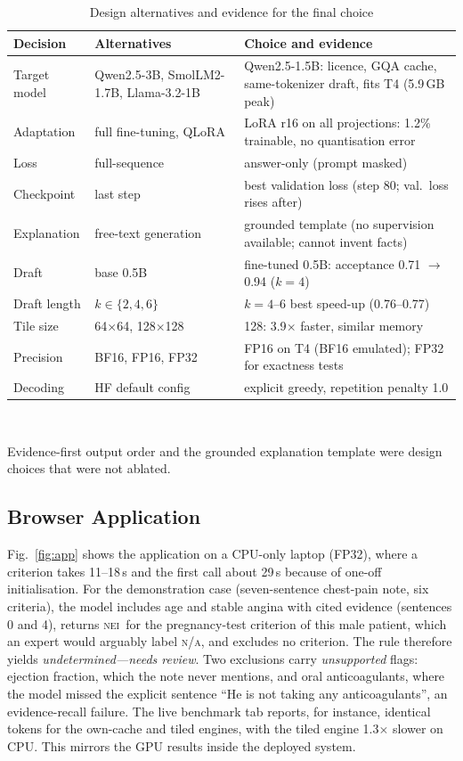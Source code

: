 \documentclass[conference]{IEEEtran}
\newcommand{\NEI}{\textsc{nei}}
\newcommand{\NA}{\textsc{n/a}}
\begin{document}
\begin{table}[t]
\caption{Design alternatives and evidence for the final choice}
\label{tab:design}
\centering
\scriptsize
\setlength{\tabcolsep}{2.5pt}
\begin{tabular}{p{1.35cm}p{2.85cm}p{3.75cm}}
\toprule
Decision & Alternatives & Choice and evidence\\
\midrule
Target model & Qwen2.5-3B, SmolLM2-1.7B, Llama-3.2-1B & Qwen2.5-1.5B: licence, GQA cache, same-tokenizer draft, fits T4 (5.9\,GB peak)\\
Adaptation & full fine-tuning, QLoRA & LoRA r16 on all projections: 1.2\% trainable, no quantisation error\\
Loss & full-sequence & answer-only (prompt masked)\\
Checkpoint & last step & best validation loss (step 80; val.\ loss rises after)\\
Explanation & free-text generation & grounded template (no supervision available; cannot invent facts)\\
Draft & base 0.5B & fine-tuned 0.5B: acceptance 0.71 $\rightarrow$ 0.94 ($k{=}4$)\\
Draft length & $k\in\{2,4,6\}$ & $k{=}4$--6 best speed-up (0.76--0.77)\\
Tile size & 64$\times$64, 128$\times$128 & 128: 3.9$\times$ faster, similar memory\\
Precision & BF16, FP16, FP32 & FP16 on T4 (BF16 emulated); FP32 for exactness tests\\
Decoding & HF default config & explicit greedy, repetition penalty 1.0\\
\bottomrule
\end{tabular}
\\[2pt]
\parbox{\columnwidth}{\scriptsize Evidence-first output order and the grounded explanation template were design choices that were not ablated.}
\end{table}

\subsection{Browser Application}
Fig.~\ref{fig:app} shows the application on a CPU-only laptop (FP32), where a criterion takes 11--18\,s and the first call about 29\,s because of one-off initialisation. For the demonstration case (seven-sentence chest-pain note, six criteria), the model includes age and stable angina with cited evidence (sentences 0 and 4), returns \NEI\ for the pregnancy-test criterion of this male patient, which an expert would arguably label \NA, and excludes no criterion. The rule therefore yields \emph{undetermined---needs review}. Two exclusions carry \emph{unsupported} flags: ejection fraction, which the note never mentions, and oral anticoagulants, where the model missed the explicit sentence ``He is not taking any anticoagulants'', an evidence-recall failure. The live benchmark tab reports, for instance, identical tokens for the own-cache and tiled engines, with the tiled engine 1.3$\times$ slower on CPU. This mirrors the GPU results inside the deployed system.
\end{document}
